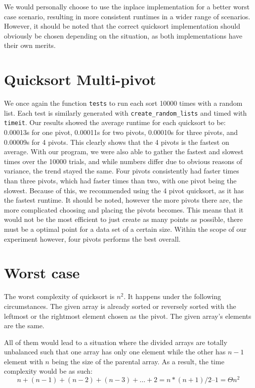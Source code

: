 \documentclass{article}
\begin{document}
\break\break
We would personally choose to use the inplace implementation for a better worst case scenario, resulting in more consistent runtimes in a wider range of scenarios. However, it should be noted that the correct quicksort implementation should obviously be chosen depending on the situation, as both implementations have their own merits.

\section*{Quicksort Multi-pivot}
We once again the function \verb|tests| to run each sort 10000 times with a random list. Each test is similarly generated with \verb|create_random_lists| and timed with \verb|timeit|. Our results showed the average runtime for each quicksort  to be: 0.00013s for one pivot, 0.00011s for two pivots, 0.00010s for three pivots, and 0.00009s for 4 pivots. This clearly shows that the 4 pivots is the fastest on average. With our program, we were also able to gather the fastest and slowest times over the 10000 trials, and while numbers differ due to obvious reasons of variance, the trend stayed the same. Four pivots consistently had faster times than three pivots, which had faster times than two, with one pivot being the slowest. Because of this, we recommended using the 4 pivot quicksort, as it has the fastest runtime. It should be noted, however the more pivots there are, the more complicated choosing and placing the pivots becomes. This means that it would not be the most efficient to just create as many points as possible, there must be a optimal point for a data set of a certain size. Within the scope of our experiment however, four pivots performs the best overall.



\section*{Worst case}
The worst complexity of quicksort is $n^2$. It happens under the following 
circumstances. The given array is already sorted or reversely sorted with 
the leftmost or the rightmost element chosen as the pivot. The given array’s 
elements are the same.

All of them would lead to a situation where the divided arrays are totally 
unbalanced such that one array has only one element while the other has $n - 1$ 
element with $n$ being the size of the parental array. As a result, the time 
complexity would be as such:
\begin{equation*}
n + (n - 1) + (n - 2) + (n - 3) + … + 2 = n * (n + 1) / 2 – 1 = \Theta{n^2}
\end{equation*}
\end{document}
